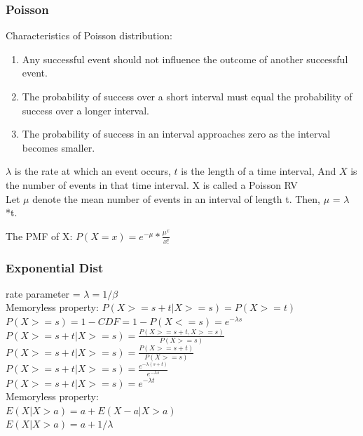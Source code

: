 \documentclass{beamer}
\begin{document}
\begin{frame}\frametitle{Poisson}
	Characteristics of Poisson distribution:
	\begin{enumerate}
		\item Any successful event should not influence the outcome of another successful event.
		\item The probability of success over a short interval must equal the probability of success over a longer interval.
		\item The probability of success in an interval approaches zero as the interval becomes smaller.
	\end{enumerate}	

	$\lambda$ is the rate at which an event occurs,
	$t$ is the length of a time interval,
	And $X$ is the number of events in that time interval. X is called a Poisson RV\\

Let $\mu$ denote the mean number of events in an interval of length t. Then, $\mu$ = $\lambda$*t.

The PMF of X: 	$P(X=x)=e^{-\mu}*\frac{\mu^x}{x!}$

	
\end{frame}

\begin{frame}\frametitle{Exponential Dist}
	rate parameter = $\lambda = 1/\beta $ \\
	Memoryless property: $P(X>=s+t | X>=s) = P(X>=t) $ \\
	$P(X>=s) = 1-CDF = 1-P(X<=s) = e^{-\lambda s}$ \\
	$P(X>=s+t | X>=s) = \frac{P(X>=s+t, X>=s)}{P(X>=s)}$ \\
	$P(X>=s+t | X>=s) = \frac{P(X>=s+t)}{P(X>=s)}$ \\
	$P(X>=s+t | X>=s) = \frac{e^{-\lambda (s+t)}}{ e^{-\lambda s}}$ \\
	$P(X>=s+t | X>=s) = e^{-\lambda t}$ \\
	Memoryless property: \\
	$E(X|X>a) = a+E(X-a|X>a)$ \\
	$E(X|X>a) = a+ 1/\lambda$ \\

\end{frame}
\end{document}
